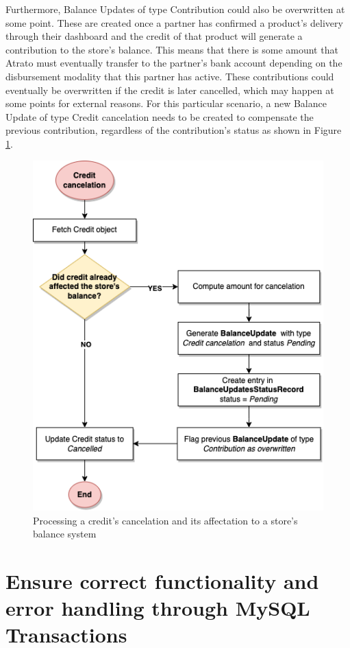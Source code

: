 Furthermore, Balance Updates of type Contribution could also be overwritten at some point. These are created once a partner has confirmed a product’s delivery through their dashboard and the credit of that product will generate a contribution to the store’s balance. This means that there is some amount that Atrato must eventually transfer to the partner’s bank account depending on the disbursement modality that this partner has active. These contributions could eventually be overwritten if the credit is later cancelled, which may happen at some points for external reasons. For this particular scenario, a new Balance Update of type Credit cancelation needs to be created to compensate the previous contribution, regardless of the contribution’s status as shown in Figure \ref{fig:dlowchart_credit_cancelation}.

\begin{figure} [h]
    \centering
    \includegraphics[scale = 0.7]{assets/flowcharts/CreditCancelation.png}
    \caption{Processing a credit's cancelation and its affectation to a store's balance system}\label{fig:dlowchart_credit_cancelation}
\end{figure}

\section{Ensure correct functionality and error handling through MySQL Transactions}

